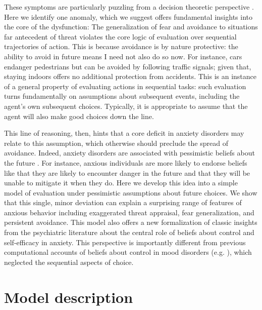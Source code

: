 \documentclass[11pt]{article} %
\begin{document}
These symptoms are particularly puzzling from a decision theoretic perspective \citep{huys2015}. Here we identify one anomaly, which we suggest offers fundamental insights into the core of the dysfunction: The generalization of fear and avoidance to situations far antecedent of threat violates the core logic of evaluation over sequential trajectories of action. This is because avoidance is by nature protective: the ability to avoid in future means I need not also do so now. For instance, cars endanger pedestrians but can be avoided by following traffic signals; given that, staying indoors offers no additional protection from accidents. This is an instance of a general property of evaluating actions in sequential tasks: such evaluation turns fundamentally on assumptions about subsequent events, including the agent's own subsequent choices. Typically, it is appropriate to assume that the agent will also make good choices down the line. 

This line of reasoning, then, hints that a core deficit in anxiety disorders may relate to this assumption, which otherwise should preclude the spread of avoidance. Indeed, anxiety disorders are associated with pessimistic beliefs about the future \citep{ClarkBeck2011}. For instance, anxious individuals are more likely to endorse beliefs like that they are likely to encounter danger in the future and that they will be unable to mitigate it when they do. Here we develop this idea into a simple model of evaluation under pessimistic assumptions about future choices. We show that this single, minor deviation can explain a surprising range of features of anxious behavior including exaggerated threat appraisal, fear generalization, and persistent avoidance. This model also offers a new formalization of classic insights from the psychiatric literature about the central role of beliefs about control and self-efficacy in anxiety. This perspective is importantly different from previous computational accounts of beliefs about control in mood disorders (e.g. \cite{HuysDayan2009}), which neglected the sequential aspects of choice. 

\section{Model description}
\end{document}
